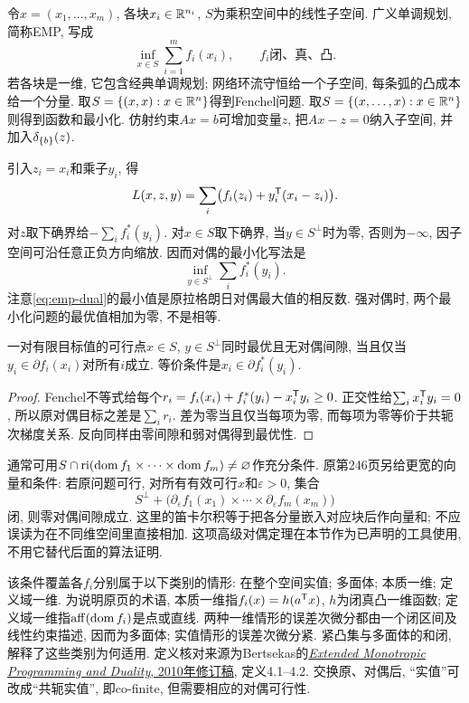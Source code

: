 令$x=(x_1,\ldots,x_m)$, 各块$x_i\in\mathbb R^{n_i}$, $S$为乘积空间中的线性子空间. 广义单调规划, 简称EMP, 写成
\begin{equation}\label{eq:emp-primal}
 \inf_{x\in S}\sum_{i=1}^m f_i(x_i),\qquad f_i\text{闭、真、凸}.
\end{equation}
若各块是一维, 它包含经典单调规划; 网络环流守恒给一个子空间, 每条弧的凸成本给一个分量. 取$S=\{(x,x):x\in\mathbb R^n\}$得到Fenchel问题. 取$S=\{(x,\ldots,x):x\in\mathbb R^n\}$则得到函数和最小化. 仿射约束$Ax=b$可增加变量$z$, 把$Ax-z=0$纳入子空间, 并加入$\delta_{\{b\}}(z)$.

引入$z_i=x_i$和乘子$y_i$, 得
\[
 L(x,z,y)=\sum_i\bigl(f_i(z_i)+y_i^{\mathsf T}(x_i-z_i)\bigr).
\]
对$z$取下确界给$-\sum_i f_i^*(y_i)$. 对$x\in S$取下确界, 当$y\in S^\perp$时为零, 否则为$-\infty$, 因子空间可沿任意正负方向缩放. 因而对偶的最小化写法是
\begin{equation}\label{eq:emp-dual}
 \inf_{y\in S^\perp}\sum_i f_i^*(y_i).
\end{equation}
注意\eqref{eq:emp-dual}的最小值是原拉格朗日对偶最大值的相反数. 强对偶时, 两个最小化问题的最优值相加为零, 不是相等.

\begin{proposition}\label{prop:emp-optimality}
一对有限目标值的可行点$x\in S$, $y\in S^\perp$同时最优且无对偶间隙, 当且仅当$y_i\in\partial f_i(x_i)$对所有$i$成立. 等价条件是$x_i\in\partial f_i^*(y_i)$.
\end{proposition}
\begin{proof}
Fenchel不等式给每个$r_i=f_i(x_i)+f_i^*(y_i)-x_i^{\mathsf T} y_i\ge0$. 正交性给$\sum_i x_i^{\mathsf T} y_i=0$, 所以原对偶目标之差是$\sum_i r_i$. 差为零当且仅当每项为零, 而每项为零等价于共轭次梯度关系. 反向同样由零间隙和弱对偶得到最优性.
\end{proof}

通常可用$S\cap\operatorname{ri}(\operatorname{dom} f_1\times\cdots\times\operatorname{dom} f_m)\ne\varnothing$作充分条件. 原第246页另给更宽的向量和条件: 若原问题可行, 对所有有效可行$x$和$\varepsilon>0$, 集合
\[
 S^\perp+\bigl(\partial_\varepsilon f_1(x_1)\times\cdots\times\partial_\varepsilon f_m(x_m)\bigr)
\]
闭, 则零对偶间隙成立. 这里的笛卡尔积等于把各分量嵌入对应块后作向量和; 不应误读为在不同维空间里直接相加. 这项高级对偶定理在本节作为已声明的工具使用, 不用它替代后面的算法证明.

该条件覆盖各$f_i$分别属于以下类别的情形: 在整个空间实值; 多面体; 本质一维; 定义域一维. 为说明原页的术语, 本质一维指$f_i(x)=h(a^{\mathsf T} x)$, $h$为闭真凸一维函数; 定义域一维指$\operatorname{aff}(\operatorname{dom} f_i)$是点或直线. 两种一维情形的误差次微分都由一个闭区间及线性约束描述, 因而为多面体; 实值情形的误差次微分紧. 紧凸集与多面体的和闭, 解释了这些类别为何适用. 定义核对来源为Bertsekas的\href{https://web.mit.edu/dimitrib/www/Extended_Mono.pdf}{\emph{Extended Monotropic Programming and Duality}, 2010年修订稿}, 定义4.1--4.2. 交换原、对偶后, “实值”可改成“共轭实值”, 即co-finite, 但需要相应的对偶可行性.

